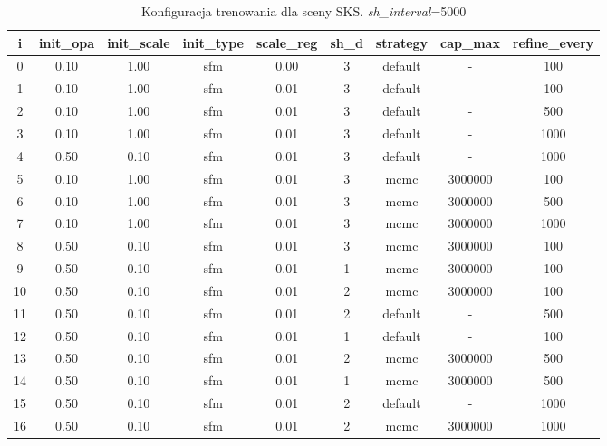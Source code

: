 \begin{table}[!h]
    \centering
    \begin{tabular}{|c|c|c|c|c|c|c|c|c|}
    \hline
    i & init\_opa & init\_scale & init\_type & scale\_reg & sh\_d & strategy & cap\_max & refine\_every \\
    \hline
    0 & 0.10 & 1.00 & sfm & 0.00 & 3 & default & - & 100 \\
    \hline
    1 & 0.10 & 1.00 & sfm & 0.01 & 3 & default & - & 100 \\
    \hline
    2 & 0.10 & 1.00 & sfm & 0.01 & 3 & default & - & 500 \\
    \hline
    3 & 0.10 & 1.00 & sfm & 0.01 & 3 & default & - & 1000 \\
    \hline
    4 & 0.50 & 0.10 & sfm & 0.01 & 3 & default & - & 1000 \\
    \hline
    5 & 0.10 & 1.00 & sfm & 0.01 & 3 & mcmc & 3000000 & 100 \\
    \hline
    6 & 0.10 & 1.00 & sfm & 0.01 & 3 & mcmc & 3000000 & 500 \\
    \hline
    7 & 0.10 & 1.00 & sfm & 0.01 & 3 & mcmc & 3000000 & 1000 \\
    \hline
    8 & 0.50 & 0.10 & sfm & 0.01 & 3 & mcmc & 3000000 & 100 \\
    \hline
    9 & 0.50 & 0.10 & sfm & 0.01 & 1 & mcmc & 3000000 & 100 \\
    \hline
    10 & 0.50 & 0.10 & sfm & 0.01 & 2 & mcmc & 3000000 & 100 \\
    \hline
    11 & 0.50 & 0.10 & sfm & 0.01 & 2 & default & - & 500 \\
    \hline
    12 & 0.50 & 0.10 & sfm & 0.01 & 1 & default & - & 100 \\
    \hline
    13 & 0.50 & 0.10 & sfm & 0.01 & 2 & mcmc & 3000000 & 500 \\
    \hline
    14 & 0.50 & 0.10 & sfm & 0.01 & 1 & mcmc & 3000000 & 500 \\
    \hline
    15 & 0.50 & 0.10 & sfm & 0.01 & 2 & default & - & 1000 \\  
    \hline
    16 & 0.50 & 0.10 & sfm & 0.01 & 2 & mcmc & 3000000 & 1000 \\
    \hline
    \end{tabular}
    \caption{Konfiguracja trenowania dla sceny SKS. \textit{sh\_interval}=5000}
    \label{table:tab_conf_sks}
\end{table}


